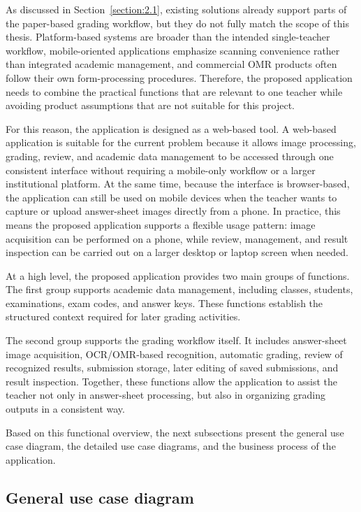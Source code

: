 \documentclass[../Main.tex]{subfiles}
\begin{document}
As discussed in Section~\ref{section:2.1}, existing solutions already support
parts of the paper-based grading workflow, but they do not fully match the
scope of this thesis. Platform-based systems are broader than the intended
single-teacher workflow, mobile-oriented applications emphasize scanning
convenience rather than integrated academic management, and commercial OMR
products often follow their own form-processing procedures. Therefore, the
proposed application needs to combine the practical functions that are relevant
to one teacher while avoiding product assumptions that are not suitable for this
project.

For this reason, the application is designed as a web-based tool. A web-based
application is suitable for the current problem because it allows image
processing, grading, review, and academic data management to be accessed
through one consistent interface without requiring a mobile-only workflow or a
larger institutional platform. At the same time, because the interface is
browser-based, the application can still be used on mobile devices when the
teacher wants to capture or upload answer-sheet images directly from a phone.
In practice, this means the proposed application supports a flexible usage
pattern: image acquisition can be performed on a phone, while review,
management, and result inspection can be carried out on a larger desktop or
laptop screen when needed.

At a high level, the proposed application provides two main groups of
functions. The first group supports academic data management, including classes,
students, examinations, exam codes, and answer keys. These functions establish
the structured context required for later grading activities.

The second group supports the grading workflow itself. It includes answer-sheet
image acquisition, OCR/OMR-based recognition, automatic grading, review of
recognized results, submission storage, later editing of saved submissions, and
result inspection. Together, these functions allow the application to assist
the teacher not only in answer-sheet processing, but also in organizing grading
outputs in a consistent way.

Based on this functional overview, the next subsections present the general use
case diagram, the detailed use case diagrams, and the business process of the
application.

\subsection{General use case diagram}
\label{subsection:2.2.1}
\end{document}

